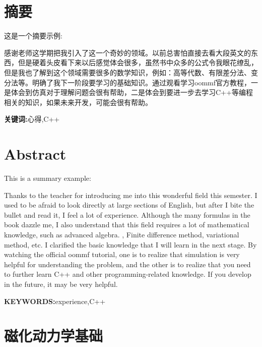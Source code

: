 		\chapter*{摘\qquad 要}
		
		这是一个摘要示例:
		
		感谢老师这学期把我引入了这一个奇妙的领域。以前总害怕直接去看大段英文的东西，但是硬着头皮看下来以后感觉体会很多，虽然书中众多的公式令我眼花缭乱，但是我也了解到这个领域需要很多的数学知识，例如：高等代数、有限差分法、变分法等。明确了我下一阶段要学习的基础知识。通过观看学习oommf官方教程，一是体会到仿真对于理解问题会很有帮助，二是体会到要进一步去学习C++等编程相关的知识，如果未来开发，可能会很有帮助。
		
		\begin{flushleft}
			\textbf{关键词:}心得,C++    %
		\end{flushleft}
		
		\chapter*{Abstract}
		
		This is a summary example:
		
		Thanks to the teacher for introducing me into this wonderful field this semester. I used to be afraid to look directly at large sections of English, but after I bite the bullet and read it, I feel a lot of experience. Although the many formulas in the book dazzle me, I also understand that this field requires a lot of mathematical knowledge, such as advanced algebra. 
		, Finite difference method, variational method, etc. 
		I clarified the basic knowledge that I will learn in the next stage. By watching the official oommf tutorial, one is to realize that simulation is very helpful for understanding the problem, and the other is to realize that you need to further learn C++ and other programming-related knowledge. If you develop in the future, it may be very helpful.
		
		\begin{flushleft}
			\textbf{KEYWORDS:}experience,C++
		\end{flushleft}


	\chapter{磁化动力学基础}
	
